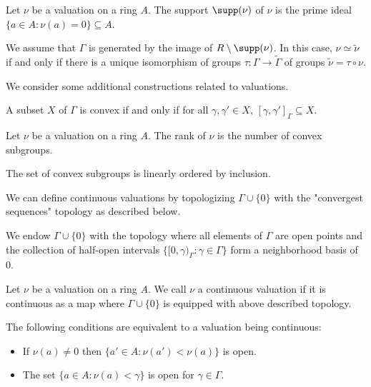 \begin{definition}\label{def: support of valuation}
    Let $\nu$ be a valuation on a ring $A$. The support $\supp(\nu)$ of $\nu$ is the prime ideal $\{a\in A:\nu(a)=0\}\subseteq A$. 
\end{definition}
\begin{remark}\label{rmk: equivalence relation on valuations}
    We assume that $\Gamma$ is generated by the image of $R\setminus\supp(\nu)$. In this case, $\nu\simeq\widetilde{\nu}$ if and only if there is a unique isomorphism of groups $\tau:\Gamma\to\widetilde{\Gamma}$ of groups $\widetilde{\nu}=\tau\circ\nu$. 
\end{remark}
We consider some additional constructions related to valuations. 
\begin{definition}\label{def: convex subset}
    A subset $X$ of $\Gamma$ is convex if and only if for all $\gamma,\gamma'\in X$, $[\gamma,\gamma']_{\Gamma}\subseteq X$. 
\end{definition}
\begin{definition}\label{def: rank of valuation}
    Let $\nu$ be a valuation on a ring $A$. The rank of $\nu$ is the number of convex subgroups. 
\end{definition}
\begin{remark}
    The set of convex subgroups is linearly ordered by inclusion. 
\end{remark}
We can define continuous valuations by topologizing $\Gamma\cup\{0\}$ with the "convergest sequences" topology as described below.
\begin{definition}\label{def: continuous valuation}
    We endow $\Gamma \cup \{ 0\}$ with the topology where all elements of
$\Gamma$ are open points and the collection of half-open intervals 
$\{[0,\gamma)_{\Gamma}:\gamma\in\Gamma\}$ form a neighborhood basis of 0.
    
    Let $\nu$ be a valuation on a ring $A$. We call $\nu$ a continuous valuation if it is continuous as a map where $\Gamma\cup\{0\}$ is equipped with above described topology.
\end{definition}
\begin{remark}
    The following conditions are equivalent to a valuation being continuous: 
    \begin{itemize}
        \item If $\nu(a)\neq0$ then $\{a'\in A:\nu(a')<\nu(a)\}$ is open. 
        \item The set $\{a\in A:\nu(a)<\gamma\}$ is open for $\gamma\in\Gamma$. 
    \end{itemize}
\end{remark}
